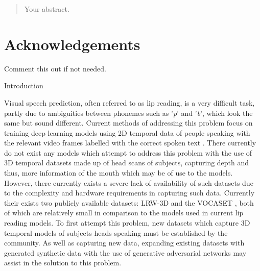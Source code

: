 \documentclass[12pt]{report}
\date{September 2019}
\begin{document}



\clearpage{\pagestyle{empty}\cleardoublepage}
\setcounter{page}{1}
\pagestyle{fancy}

\begin{abstract}
Your abstract.

\end{abstract}

\cleardoublepage
\section*{Acknowledgements}
Comment this out if not needed.

\clearpage{\pagestyle{empty}\cleardoublepage}

\tableofcontents 


\clearpage{\pagestyle{empty}\cleardoublepage}
\setcounter{page}{1}
\fancyhead[L,RO]{\slshape \rightmark}
\fancyhead[LO,R]{\slshape \leftmark}

Introduction

Visual speech prediction, often referred to as lip reading, is a very difficult task, partly due to ambiguities between phonemes such as '\textit{p}' and '\textit{b}', which look the same but sound different.
Current methods of addressing this problem focus on training deep learning models using 2D temporal data of people speaking with the relevant video frames labelled with the correct spoken text \cite{Chung2016, Assael2016, Chung2017, Shillingford2018}.
There currently do not exist any models which attempt to address this problem with the use of 3D temporal datasets made up of head scans of subjects, capturing depth and thus, more information of the mouth which may be of use to the models.
However, there currently exists a severe lack of availability of such datasets due to the complexity and hardware requirements in capturing such data.
Currently their exists two publicly available datasets: LRW-3D \cite{Tzirakis2019} and the VOCASET \cite{Cudeiro2019}, both of which are relatively small in comparison to the models used in current lip reading models.
To first attempt this problem, new datasets which capture 3D temporal models of subjects heads speaking must be established by the community.
As well as capturing new data, expanding existing datasets with generated synthetic data with the use of generative adversarial networks may assist in the solution to this problem.
\end{document}

